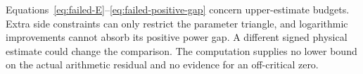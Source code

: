 Equations~\eqref{eq:failed-E}--\eqref{eq:failed-positive-gap} concern upper-estimate budgets. Extra side constraints can only restrict the parameter triangle, and logarithmic improvements cannot absorb its positive power gap. A different signed physical estimate could change the comparison. The computation supplies no lower bound on the actual arithmetic residual and no evidence for an off-critical zero.
